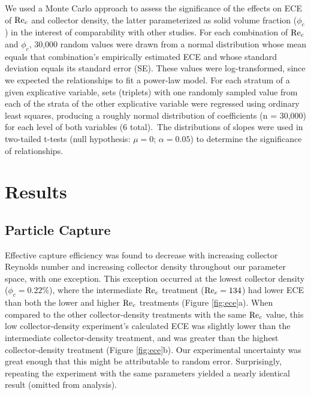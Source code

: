 \documentclass[geosciences,article,submit,moreauthors,pdftex]{Definitions/mdpi}
\begin{document}
We used a Monte Carlo approach to assess the significance of the effects on ECE of $\mathrm{Re}_c$ and collector density, the latter parameterized as solid volume fraction ($\phi_c$) in the interest of comparability with other studies. For each combination of $\mathrm{Re}_c$ and $\phi_c$, 30,000 random values were drawn from a normal distribution whose mean equals that combination's empirically estimated ECE and whose standard deviation equals its standard error (SE). These values were log-transformed, since we expected the relationships to fit a power-law model. For each stratum of a given explicative variable, sets (triplets) with one randomly sampled value from each of the strata of the other explicative variable were regressed using ordinary least squares, producing a roughly normal distribution of coefficients (n = 30,000) for each level of both variables (6 total). The distributions of slopes were used in two-tailed t-tests (null hypothesis: $\mu = 0$; $\alpha = 0.05$) to determine the significance of relationships.

\section{Results}

\subsection{Particle Capture}

Effective capture efficiency was found to decrease with increasing collector Reynolds number and increasing collector density throughout our parameter space, with one exception. This exception occurred at the lowest collector density ($\phi_c = 0.22\%$), where the intermediate $\mathrm{Re}_c$ treatment ($\mathrm{Re}_c = 134$) had lower ECE than both the lower and higher $\mathrm{Re}_c$ treatments (Figure \ref{fig:ece}a). When compared to the other collector-density treatments with the same $\mathrm{Re}_c$ value, this low collector-density experiment's calculated ECE was slightly lower than the intermediate collector-density treatment, and was greater than the highest collector-density treatment (Figure \ref{fig:ece}b). Our experimental uncertainty was great enough that this might be attributable to random error. Surprisingly, repeating the experiment with the same parameters yielded a nearly identical result (omitted from analysis).
\end{document}
